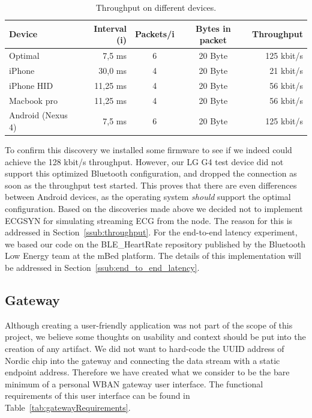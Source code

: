 \begin{table}[]
\centering
\caption{Throughput on different devices.}
\label{tab:ble_device_throughput}
\begin{tabular}{@{}lrccr@{}}
\toprule
\textbf{Device}   & \textbf{Interval (i)} & \textbf{Packets/i} & \textbf{Bytes in packet} & \textbf{Throughput} \\ \midrule
Optimal	          & 7,5 ms	  & 6	  & 20 Byte	  & 125 kbit/s \\
iPhone	          & 30,0 ms	  & 4	  & 20 Byte	  & 21 kbit/s   \\
iPhone HID	      & 11,25 ms	& 4	  & 20 Byte	  & 56 kbit/s \\
Macbook pro	      & 11,25 ms	& 4	  & 20 Byte	  & 56 kbit/s \\
Android (Nexus 4)	& 7,5 ms	  & 6	  & 20 Byte	  & 125 kbit/s  \\ \bottomrule
\end{tabular}
\end{table}


To confirm this discovery we installed some firmware \cite{nordic:throughputtest} to see if we indeed could achieve the 128 kbit/s throughput. However, our LG G4 test device did not support this optimized Bluetooth configuration, and dropped the connection as soon as the throughput test started. This proves that there are even differences between Android devices, as the operating system \emph{should} support the optimal configuration. Based on the discoveries made above we decided not to implement ECGSYN for simulating streaming ECG from the node. The reason for this is addressed in Section~\ref{ssub:throughput}. For the end-to-end latency experiment, we based our code on the BLE\_HeartRate repository \cite{mbed:bleheartrate} published by the Bluetooth Low Energy team at the mBed platform. The details of this implementation will be addressed in Section~\ref{ssub:end_to_end_latency}.


\subsection{Gateway} %
\label{sub:gateway}

Although creating a user-friendly application was not part of the scope of this project, we believe some thoughts on usability and context should be put into the creation of any artifact. We did not want to hard-code the UUID address of Nordic chip into the gateway and connecting the data stream with a static endpoint address. Therefore we have created what we consider to be the bare minimum of a personal WBAN gateway user interface. The functional requirements of this user interface can be found in Table~\ref{tab:gatewayRequirements}.


